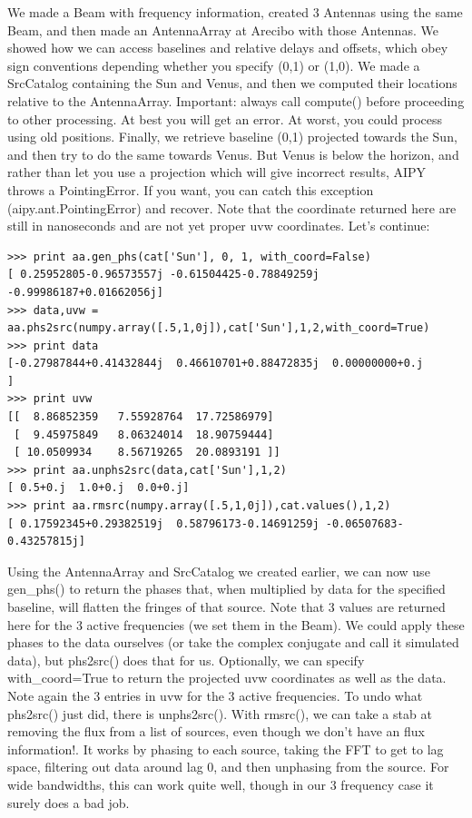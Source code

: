 We made a Beam with frequency information, created 3 Antennas using the
same Beam, and then made an AntennaArray at Arecibo with those Antennas.
We showed how we can access baselines and relative delays and offsets, which
obey sign conventions depending whether you specify (0,1) or (1,0).  We
made a SrcCatalog containing the Sun and Venus, and then we computed their
locations relative to the AntennaArray. Important: always call compute()
before proceeding to other processing.  At best you will get an error.  At
worst, you could process using old positions.  Finally, we retrieve baseline
(0,1) projected towards the Sun, and then try to do the same towards Venus.
But Venus is below the horizon, and rather than let you use a projection
which will give incorrect results, AIPY throws a PointingError.  If you want,
you can catch this exception (aipy.ant.PointingError) and recover.  Note
that the coordinate returned here are still in nanoseconds and are not
yet proper uvw coordinates.  Let's continue:

\begin{verbatim}
>>> print aa.gen_phs(cat['Sun'], 0, 1, with_coord=False)
[ 0.25952805-0.96573557j -0.61504425-0.78849259j -0.99986187+0.01662056j]
>>> data,uvw = aa.phs2src(numpy.array([.5,1,0j]),cat['Sun'],1,2,with_coord=True)
>>> print data
[-0.27987844+0.41432844j  0.46610701+0.88472835j  0.00000000+0.j        ]
>>> print uvw
[[  8.86852359   7.55928764  17.72586979]
 [  9.45975849   8.06324014  18.90759444]
 [ 10.0509934    8.56719265  20.0893191 ]]
>>> print aa.unphs2src(data,cat['Sun'],1,2)
[ 0.5+0.j  1.0+0.j  0.0+0.j]
>>> print aa.rmsrc(numpy.array([.5,1,0j]),cat.values(),1,2)
[ 0.17592345+0.29382519j  0.58796173-0.14691259j -0.06507683-0.43257815j]
\end{verbatim}

Using the AntennaArray and SrcCatalog we created earlier, we can now
use gen\_phs() to return the phases that, when multiplied by data for the
specified baseline, will flatten the fringes of that source.  Note that
3 values are returned here for the 3 active frequencies (we set them
in the Beam).  We could apply these phases to the data ourselves (or
take the complex conjugate and call it simulated data), but 
phs2src() does that for us.  Optionally, we can specify with\_coord=True
to return the projected uvw coordinates as well as the data.  Note again
the 3 entries in uvw for the 3 active frequencies.  To undo what
phs2src() just did, there is unphs2src().  With rmsrc(), we can take a stab
at removing the flux from a list of sources, even though we don't have
an flux information!.  It works by phasing to each source,
taking the FFT to get to lag space, filtering out data around lag 0,
and then unphasing from the source.  For wide bandwidths, this can work
quite well, though in our 3 frequency case it surely does a bad job.

